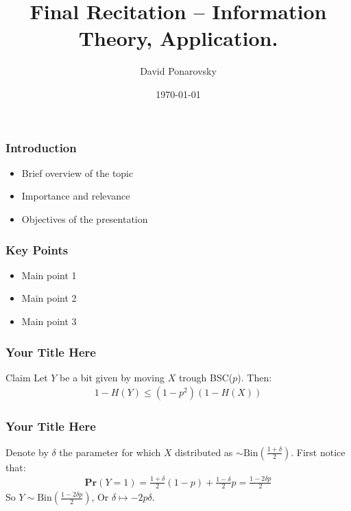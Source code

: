 \documentclass{beamer}
\begin{document}
 
 

\begin{frame}
    \title{Final Recitation – Information Theory, Application.}
    \author{David Ponarovsky}
    \date{\today}
    \titlepage
\end{frame}


\begin{frame}

\frametitle{Introduction}
\begin{itemize}
    \item Brief overview of the topic
    \item Importance and relevance
    \item Objectives of the presentation
\end{itemize}
\end{frame}

\begin{frame}
\frametitle{Key Points}
\begin{itemize}
    \item Main point 1
    \item Main point 2
    \item Main point 3
\end{itemize}
\end{frame}

\begin{frame}
  \frametitle{Your Title Here}
  
\begin{block}{Claim}
  Let $Y$ be a bit given by moving $X$ trough BSC($p$). Then:
  \begin{equation*}
    \begin{split}
      1 - H(Y) \le \left( 1 - p^{2} \right)\left( 1 - H(X) \right)
    \end{split}
  \end{equation*}
\end{block}

\end{frame}

\begin{frame}
  \frametitle{Your Title Here}
  Denote by $\delta$ the parameter for which $X$ distributed as $\sim \text{Bin}(\frac{1+\delta}{2})$. First notice that:  
  \begin{equation*}
    \begin{split}
      \textbf{Pr}\left( Y = 1 \right) = \frac{1+\delta}{2} (1 -p) + \frac{1-\delta}{2}p = \frac{1 - 2\delta p}{2}  
    \end{split}
  \end{equation*}
  So $Y \sim \text{Bin}(  \frac{1 - 2\delta p}{2} )$, Or $\delta \mapsto -2p \delta$. 
\end{frame}
\end{document}
